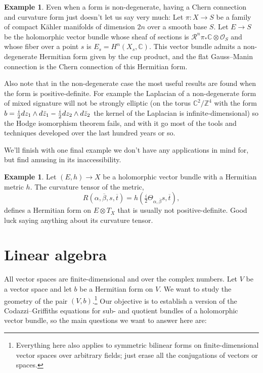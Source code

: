 \documentclass[10pt,a4paper]{amsart}
\theoremstyle{definition}
\newtheorem{exam}[theo]{Example}
\newcommand{\kk}[1]{\mathbb{#1}}
\def\ov#1{\overline{#1}}
\def\kahler{K\"ahler}
\begin{document}
\begin{exam}
Even when a form is non-degenerate, having a Chern connection and curvature
form just doesn't let us say very much: Let $\pi : X \to S$ be a family of
compact \kahler{} manifolds of dimension $2n$ over a smooth base $S$.
Let $E \to S$ be the holomorphic vector bundle whose sheaf of sections is
$\mathcal R^{n}\pi_{*}\mathbb C \otimes \mathcal O_{S}$ and whose fiber over a
point $s$ is $E_{s} = H^{n}(X_{s}, \mathbb C)$. This vector bundle admits a
non-degenerate Hermitian form given by the cup product, and the flat
Gauss--Manin connection is the Chern connection of this Hermitian form.
\end{exam}

Also note that in the non-degenerate case the most useful results are found
when the form is positive-definite. For example the Laplacian of a
non-degenerate form of mixed signature will not be strongly elliptic
(on the torus $\kk C^2 / \kk Z^4$ with the form $b = \smash{\frac i2}
dz_1 \wedge d \bar z_1 - \smash{\frac i2} dz_2 \wedge d\bar z_2$ the kernel of
the Laplacian is infinite-dimensional)
so the Hodge isomorphism theorem fails, and with it go most of the tools and techniques developed over the last hundred years or so.

We'll finish with one final example we don't have any applications in mind for, but find amusing in its inaccessibility.

\begin{exam}
Let $(E,h) \to X$ be a holomorphic vector bundle with a Hermitian metric $h$. The curvature tensor of the metric,
\[
  R(\alpha, \ov\beta, s, \ov t)
  = h(\tfrac i2 \Theta_{\alpha, \ov\beta}s, \ov t),
\]
defines a Hermitian form on $E \otimes T_{X}$ that is usually not positive-definite. Good luck saying anything about its curvature tensor.
\end{exam}



\section{Linear algebra}
\label{sec:degenerate-linear-algebra}



All vector spaces are finite-dimensional and over the complex numbers. Let $V$
be a vector space and let $b$ be a Hermitian form on $V$. We want to study the
geometry of the pair $(V,b)$.\footnote{Everything here also applies to
symmetric bilinear forms on finite-dimensional vector spaces over arbitrary
fields; just erase all the conjugations of vectors or spaces.}
Our objective is to establish a version of the Codazzi--Griffiths equations for
sub- and quotient bundles of a holomorphic vector bundle, so the main questions
we want to answer here are:
\end{document}
